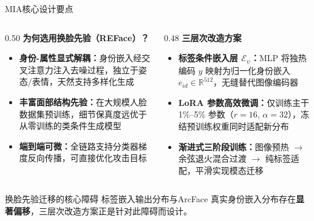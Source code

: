 \documentclass[aspectratio=169,12pt]{beamer}
\renewcommand{\textbf}[1]{\textcolor{hitblue}{\bfseries #1}}
\newcommand{\highlight}[1]{\textcolor{hitblue}{\textbf{#1}}}
\begin{document}
\begin{frame}{MIA核心设计要点}
\footnotesize
\begin{columns}[T]
\begin{column}{0.50\textwidth}
\textbf{为何选用换脸先验（REFace）？}
\begin{itemize}\setlength{\itemsep}{2pt}
  \item \highlight{身份-属性显式解耦：}身份嵌入经交叉注意力注入去噪过程，独立于姿态/表情，天然支持多样化生成
  \item \highlight{丰富面部结构先验：}在大规模人脸数据集预训练，细节保真度远优于从零训练的类条件生成模型
  \item \highlight{端到端可微：}全链路支持分类器梯度反向传播，可直接优化攻击目标
\end{itemize}
\end{column}
\begin{column}{0.48\textwidth}
\textbf{三层次改造方案}
\begin{itemize}\setlength{\itemsep}{2pt}
  \item \highlight{标签条件嵌入层 $\mathcal{E}_\psi$：}MLP 将独热编码 $y$ 映射为归一化身份嵌入 $e_{id}\!\in\!\mathbb{R}^{512}$，无缝替代图像编码器
  \item \highlight{LoRA 参数高效微调：}仅训练主干 1\%--5\% 参数（$r{=}16,\,\alpha{=}32$），冻结预训练权重同时适配新分布
  \item \highlight{渐进式三阶段训练：}图像预热 $\to$ 余弦退火混合过渡 $\to$ 纯标签适配，平滑实现模态迁移
\end{itemize}
\end{column}
\end{columns}
\vspace{4pt}
\begin{alertblock}{换脸先验迁移的核心障碍}
\scriptsize
标签嵌入输出分布与ArcFace 真实身份嵌入分布存在\textbf{显著偏移}，三层次改造方案正是针对此障碍而设计。
\end{alertblock}
\end{frame} %
\end{document}
